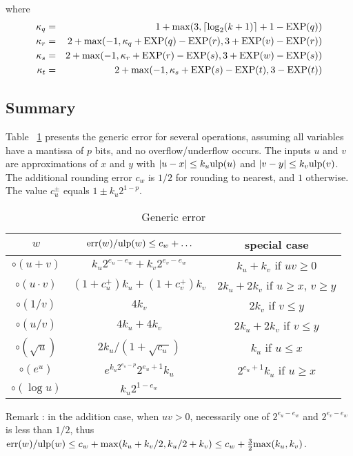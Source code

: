 \documentclass[12pt]{amsart}
\def\ulp{{\rm ulp}}
\def\Exp{{\rm EXP}}
\def\err{{\rm err}}
\begin{document}
where 
\begin{eqnarray*}
\kappa_q & = & 1 + {\rm max}(3, \lceil\log_2(k+1)\rceil + 1 - \Exp(q))\\
\kappa_r & = & 2 + {\rm max}(-1, \kappa_q + \Exp(q) - \Exp(r),
3 + \Exp(v) - \Exp(r))\\
\kappa_s & = & 2 + {\rm max}(-1, \kappa_r + \Exp(r) - \Exp(s),
3 + \Exp(w) - \Exp(s))\\
\kappa_t & = & 2 + {\rm max}(-1, \kappa_s + \Exp(s) - \Exp(t),
3 - \Exp(t))
\end{eqnarray*}


\subsection{Summary}

Table ~\ref{table:genericError} presents the generic error for several operations, assuming all variables have a
mantissa of $p$ bits, and no overflow/underflow occurs.
The inputs $u$ and $v$ are
approximations of $x$ and $y$ with $|u-x| \le k_u \ulp(u)$ and
$|v-y| \le k_v \ulp(v)$. The additional rounding error $c_w$ is $1/2$ for
rounding to nearest, and $1$ otherwise.
The value $c^{\pm}_u$ equals $1 \pm k_u 2^{1-p}$.

\begin{table}[h]
\begin{center}
\begin{tabular}{|c|c|c|} \hline
   $w$        & $\err(w)/\ulp(w) \le c_w + \ldots$ &special case\\ \hline\hline
$\circ(u+v)$ & $k_u 2^{e_u-e_w} + k_v 2^{e_v-e_w}$ & $k_u + k_v$ if $u v \ge 0$\\
$\circ(u \cdot v)$ & $(1+c^{+}_u)k_u + (1+c^{+}_v)k_v$ & $2k_u + 2k_v$ if $u \ge x$, $v \ge y$\\
$\circ(1/v)$ & $4 k_v$ & $2 k_v$ if $v \le y$ \\
$\circ(u/v)$ & $4 k_u + 4 k_v$ & $2 k_u + 2 k_v$ if $v \le y$ \\
$\circ(\sqrt{u})$ & $2 k_u/(1+\sqrt{c^{-}_u})$ & $k_u$ if $u \le x$ \\
$\circ(e^u)$ & $e^{k_u 2^{e_u-p}} 2^{e_u+1} k_u$ & $2^{e_u+1} k_u$ if $u \ge x$ \\
$\circ(\log u)$ & $k_u 2^{1-e_w}$ & \\
\hline
\end{tabular}
\end{center}
\caption{Generic error}
\label{table:genericError}
\end{table}
Remark : in the addition case, when $u v > 0$,
necessarily one of $2^{e_u-e_w}$ and $2^{e_v-e_w}$ is less than $1/2$,
thus $\err(w)/\ulp(w) \le c_w + {\rm max}(k_u + k_v/2, k_u/2 + k_v)
        \le c_w + \frac{3}{2} {\rm max}(k_u, k_v)$.
\end{document}
